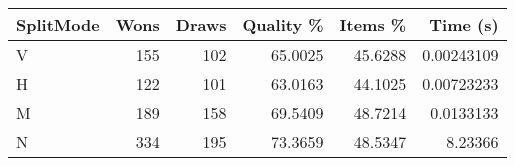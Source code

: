 \begin{tabular}{lrrrrr}
    \hline
    SplitMode & Wons & Draws & Quality \% & Items \% & Time (s)   \\
    \hline
    V         & 155  & 102   & 65.0025    & 45.6288  & 0.00243109 \\
    H         & 122  & 101   & 63.0163    & 44.1025  & 0.00723233 \\
    M         & 189  & 158   & 69.5409    & 48.7214  & 0.0133133  \\
    N         & 334  & 195   & 73.3659    & 48.5347  & 8.23366    \\
    \hline
\end{tabular}